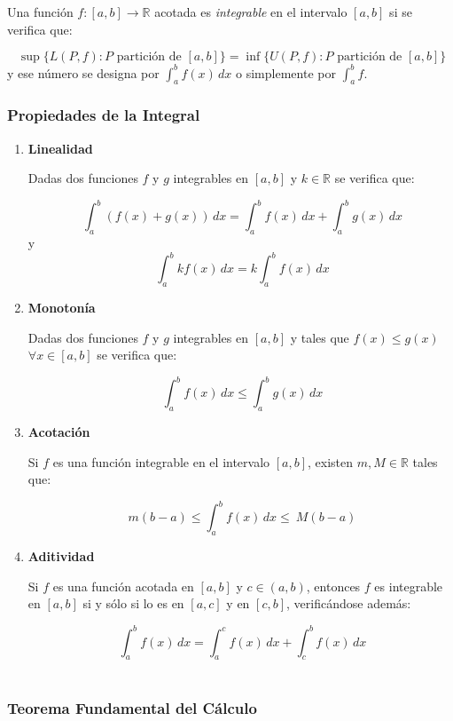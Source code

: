 Una función $f:[a,b]\rightarrow\mathbb{R}$ acotada es
\emph{integrable} en el intervalo $[a,b]$ si se verifica que:

\[
\ \sup\{L(P,f): P \textrm{ partición de } [a,b]\}=\inf\{U(P,f): P
\textrm{ partición de }[a,b]\}
\]
y ese número se designa por $\int_{a}^{b}f(x)\,dx$ o simplemente por
$\int_{a}^{b}f$.


\subsubsection*{Propiedades de la Integral}

\begin{enumerate}

\item \textbf{Linealidad}

Dadas dos funciones $f$ y $g$ integrables en $[a,b]$ y $k \in
\mathbb{R}$ se verifica que:

\[
\
\int_{a}^{b}(f(x)+g(x))\,dx=\int_{a}^{b}f(x)\,dx+\int_{a}^{b}g(x)\,dx
\]
y
\[
\ \int_{a}^{b}{kf(x)}\,dx=k\int_{a}^{b}{f(x)}\,dx
\]

\item \textbf{Monotonía}

Dadas dos funciones $f$ y $g$ integrables en $[a,b]$ y tales que
$f(x)\leq g(x)$ $\forall x \in [a,b]$ se verifica que:


\[
\ \int_{a}^{b}{f(x)\,dx} \leq \int_{a}^{b}{g(x)\,dx}
\]

\item \textbf{Acotación}

Si $f$ es una función integrable en el intervalo $[a,b]$, existen
$m,M\in\mathbb{R}$ tales que:

\[
\ m(b-a)\leq\int_{a}^{b}{f(x)\,dx} \leq \ M(b-a)
\]

\item \textbf{Aditividad}

Si $f$ es una función acotada en $[a,b]$ y $c\in(a,b)$, entonces $f$
es integrable en $[a,b]$ si y sólo si lo es en $[a,c]$ y en $[c,b]$,
verificándose además:

\[
\ \int_{a}^{b}{f(x)\,dx} =
\int_{a}^{c}{f(x)\,dx}+\int_{c}^{b}{f(x)\,dx}
\]\\

\end{enumerate}

\subsubsection*{Teorema Fundamental del Cálculo}

